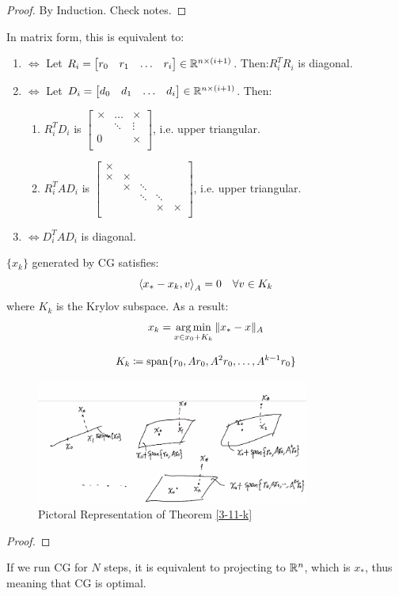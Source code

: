 \documentclass[../main/main.tex]{subfiles}
\begin{document}
    \begin{proof}
By Induction. Check notes.
    \end{proof}
    In matrix form, this is equivalent to:
    \begin{enumerate}
\item $\iff $ Let $R_{i}= \begin{bmatrix}
r_{0}&r_{1}& \ldots &r_{i}
\end{bmatrix}\in \mathbb{R} ^{n \times (i+1)}$. Then:$R_{i}^{T}R_{i}$ is diagonal.
\item $\iff $ Let $D_{i}= \begin{bmatrix}
d_{0}&d_{1}& \ldots &d_{i}
\end{bmatrix}\in \mathbb{R} ^{n \times (i+1)}$. Then:
\begin{enumerate}
  \item $R_{i}^{T}D_{i}$ is  $\begin{bmatrix}
\times   &\ldots &\times \\
 & \ddots&\vdots\\
 0& &\times \\
  \end{bmatrix}$, i.e. upper triangular.

  \item $R_{i}^{T}AD_{i}$ is  $\begin{bmatrix}
    \times  &&&& \\
    \times  &\times &&& \\
      &\times  &\ddots&& \\
      &&\ddots &\ddots& \\
      &&&\times &\times \\
  \end{bmatrix}$, i.e. upper triangular.
\end{enumerate}
\item $\iff D_{i}^{T}A D_{i}$ is diagonal.
    \end{enumerate}
\begin{theorem}\label{3-11-k}
  $\{x_{k}\}$ generated by CG satisfies: \[
\left\langle{x_{*}-x_{k}},{v}\right\rangle_{A}=0 \quad \forall v\in K_{k}
\] where $K_{k}$ is the Krylov subspace. As a result: \[
x_{k} = \operatorname*{arg\,min}_{x\in x_{0}+K_{k}}  \|x_{*}-x\|_{A}\]
\end{theorem}
\begin{definition}
  \[
    K_{k}\coloneqq \operatorname{span} \{r_{0}, Ar_{0}, A^2r_{0}, \ldots ,A^{k-1}r_{0}\}
  \]
\end{definition}
\begin{figure}[htpb]
  \centering
  \includegraphics[width=0.8\textwidth]{../images/3-11-k.png}
  \caption{Pictoral Representation of Theorem \ref{3-11-k}}
\end{figure}
\begin{proof}

\end{proof}
\begin{corollary}
If we run CG for $N$ steps, it is equivalent to projecting to $\mathbb{R} ^{n}$, which is $x_{*}$, thus meaning that CG is optimal.
\end{corollary}
\end{document}
